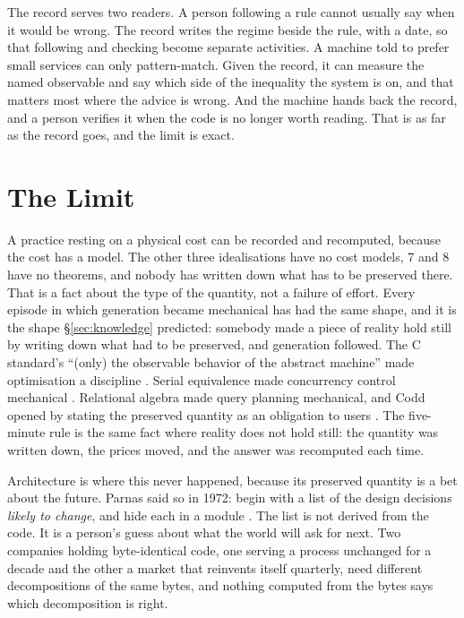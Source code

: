 \documentclass[11pt,oneside]{article}
\theoremstyle{definition}
\theoremstyle{remark}
\begin{document}
The record serves two readers. A person following a rule
cannot usually say when it would be wrong. The record writes the regime beside the rule,
with a date, so that following and checking become separate activities. A machine told to
prefer small services can only pattern-match. Given the record, it can measure the named
observable and say which side of the inequality the system is on, and that matters most
where the advice is wrong. And the machine hands back the record, and a person verifies
it when the code is no longer worth reading. That is as far as the record goes, and the limit is exact.

\section{The Limit}\label{sec:stops}
A practice resting on a physical cost can be recorded and recomputed, because the cost has
a model. The other three idealisations have no cost models, 7 and 8 have no theorems, and
nobody has written down what has to be preserved there. That is a fact about the type of
the quantity, not a failure of effort. Every episode in which generation became mechanical
has had the same shape, and it is the shape \S\ref{sec:knowledge} predicted: somebody made
a piece of reality hold still by writing down what had to be preserved, and generation
followed.  The C standard's ``(only) the observable behavior of the abstract machine'' made
optimisation a discipline \cite{c11}. Serial equivalence made concurrency control
mechanical \cite{eswaran1976}. Relational algebra made query planning mechanical, and Codd
opened by stating the preserved quantity as an obligation to users \cite{codd1970}. The
five-minute rule is the same fact where reality does not hold still: the quantity was
written down, the prices moved, and the answer was recomputed each time.

Architecture is where this never happened, because its preserved quantity is a bet about
the future. Parnas said so in 1972: begin with a list of the design decisions \emph{likely
to change}, and hide each in a module \cite{parnas1972}. The list is not derived from the
code. It is a person's guess about what the world will ask for next. Two companies holding
byte-identical code, one serving a process unchanged for a decade and the other a market
that reinvents itself quarterly, need different decompositions of the same bytes, and
nothing computed from the bytes says which decomposition is right.
\end{document}
